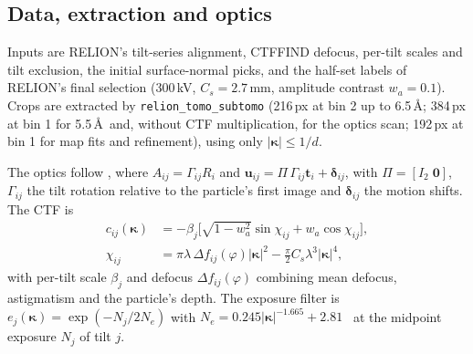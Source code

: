 \subsection{Data, extraction and optics}
\label{sec:suppl:method:data}

Inputs are RELION's tilt-series alignment, CTFFIND defocus, per-tilt scales and tilt exclusion, the initial surface-normal picks, and the half-set labels of RELION's final selection (300\,kV, $C_s=2.7$\,mm, amplitude contrast $w_a=0.1$).
Crops are extracted by \texttt{relion\_tomo\_subtomo} (216\,px at bin 2 up to 6.5\,\AA; 384\,px at bin 1 for 5.5\,\AA\ and, without CTF multiplication, for the optics scan; 192\,px at bin 1 for map fits and refinement), using only $|\bm{\kappa}|\le1/d$.

The optics follow , where $A_{ij}=\Gamma_{ij}R_i$ and $\mathbf{u}_{ij}=\Pi\,\Gamma_{ij}\mathbf{t}_i+\bm{\delta}_{ij}$, with $\Pi=[I_2\;\mathbf{0}]$, $\Gamma_{ij}$ the tilt rotation relative to the particle's first image and $\bm{\delta}_{ij}$ the motion shifts. The CTF is
\begin{equation}
\begin{aligned}
c_{ij}(\bm{\kappa})&=-\beta_j\big[\sqrt{1-w_a^2}\sin\chi_{ij}+w_a\cos\chi_{ij}\big],\\
\chi_{ij}&=\pi\lambda\,\Delta f_{ij}(\varphi)|\bm{\kappa}|^2-\tfrac{\pi}{2}C_s\lambda^3|\bm{\kappa}|^4,
\end{aligned}
\label{eq:ctf}
\end{equation}
with per-tilt scale $\beta_j$ and defocus $\Delta f_{ij}(\varphi)$ combining mean defocus, astigmatism and the particle's depth.
The exposure filter is $e_j(\bm{\kappa})=\exp(-N_j/2N_e)$ with $N_e=0.245|\bm{\kappa}|^{-1.665}+2.81$~\cite{grant2015dose} at the midpoint exposure $N_j$ of tilt $j$.

